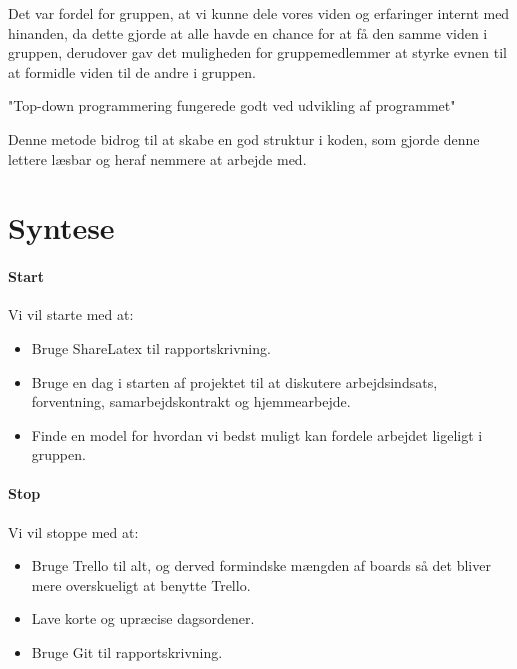 Det var fordel for gruppen, at vi kunne dele vores viden og erfaringer internt med hinanden, da dette gjorde at alle havde en chance for at få den samme viden i gruppen, derudover gav det muligheden for gruppemedlemmer at styrke evnen til at formidle viden til de andre i gruppen.

"Top-down programmering fungerede godt ved udvikling af programmet"

Denne metode bidrog til at skabe en god struktur i koden, som gjorde denne lettere læsbar og heraf nemmere at arbejde med.


\section{Syntese}

\paragraph{Start}
Vi vil starte med at:
\begin{itemize}
  \item Bruge ShareLatex til rapportskrivning. 
  \item Bruge en dag i starten af projektet til at diskutere arbejdsindsats, forventning, samarbejdskontrakt og hjemmearbejde. 
  \item Finde en model for hvordan vi bedst muligt kan fordele arbejdet ligeligt i gruppen.  
\end{itemize}

\paragraph{Stop}
Vi vil stoppe med at:
\begin{itemize}
  \item Bruge Trello til alt, og derved formindske mængden af boards så det bliver mere overskueligt at benytte Trello.
  \item Lave korte og upræcise dagsordener.
  \item Bruge Git til rapportskrivning.
\end{itemize}

